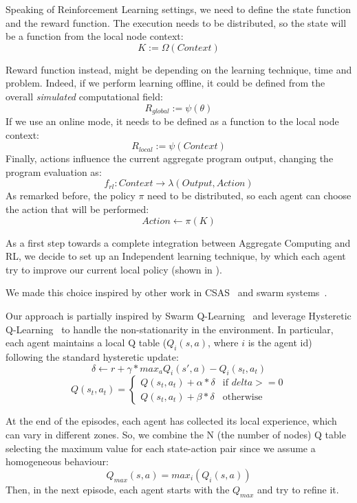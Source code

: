 \documentclass[conference]{IEEEtran}
\begin{document}
Speaking of Reinforcement Learning settings, we need to define the state function and the reward function.
%
The execution needs to be distributed, so the state will be a function from the local node context:
$$
K := \Omega(\textit{Context})
$$

Reward function instead, might be depending on the learning technique, time and problem. 
 Indeed, if we perform learning offline, it could be defined from the overall \textit{simulated} computational field:
$$
\textit{R}_{global} := \psi({\theta})
$$
If we use an online mode, it needs to be defined as a function to the local node context:
$$
\textit{R}_{local} := \psi(\textit{Context})
$$
Finally, actions influence the current aggregate program output, changing the program evaluation as:
$$
f_{rl} : \textit{Context} \rightarrow \lambda(\textit{Output}, \textit{Action})
$$
As remarked before, the policy $\pi$ need to be distributed, so each agent can choose the action that will be performed:
$$
\textit{Action} \leftarrow \pi(K)
$$

As a first step towards a complete integration between Aggregate Computing and RL, we decide to set up an Independent learning technique, 
 by which each agent try to improve our current local policy (shown in ). 
 
We made this choice inspired by other work in CSAS~\cite{csas-and-marl} and swarm systems~\cite{nguyen2018swarm}.

Our approach is partially inspired by Swarm Q-Learning~\cite{nguyen2018swarm} and leverage Hysteretic Q-Learning~\cite{hysteretic-q} to 
 handle the non-stationarity in the environment.
%
In particular, each agent maintains a local Q table ($Q_i(s, a)$, where $i$ is the agent id) following the standard hysteretic update:
$$
\delta \leftarrow r + \gamma * max_a Q_i(s', a) - Q_i(s_t, a_t)
$$
$$
Q(s_t, a_t) =  \begin{cases} 
  Q(s_t, a_t) + \alpha * \delta & \mbox{if } delta >= 0 \\ 
  Q(s_t, a_t) + \beta * \delta & \mbox{otherwise }
\end{cases}
$$

At the end of the episodes, each agent has collected its local experience, which can vary in different zones. So, 
 we combine the N (the number of nodes) Q table selecting the maximum value for each state-action pair since we assume a homogeneous behaviour:
$$
Q_{max}(s, a) = max_i(Q_i(s, a))
$$
Then, in the next episode, each agent starts with the $Q_{max}$ and try to refine it.
\end{document}

